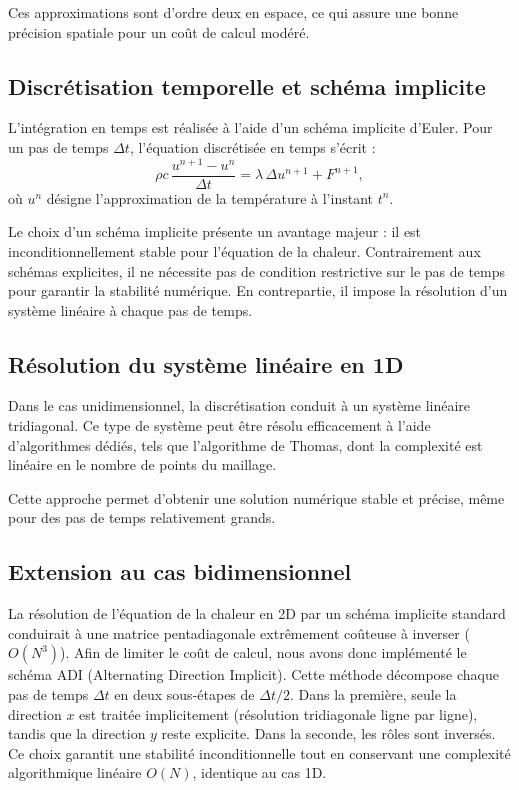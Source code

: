 \documentclass[a4paper,12pt]{article}
\begin{document}
Ces approximations sont d’ordre deux en espace, ce qui assure une bonne précision spatiale pour un coût de calcul modéré.

\subsection{Discrétisation temporelle et schéma implicite}

L’intégration en temps est réalisée à l’aide d’un schéma implicite d’Euler. Pour un pas de temps $\Delta t$, l’équation discrétisée en temps s’écrit :
\begin{equation}
\rho c \, \frac{u^{n+1} - u^n}{\Delta t}
= \lambda \, \Delta u^{n+1} + F^{n+1},
\end{equation}
où $u^n$ désigne l’approximation de la température à l’instant $t^n$.

Le choix d’un schéma implicite présente un avantage majeur : il est inconditionnellement stable pour l’équation de la chaleur. Contrairement aux schémas explicites, il ne nécessite pas de condition restrictive sur le pas de temps pour garantir la stabilité numérique. En contrepartie, il impose la résolution d’un système linéaire à chaque pas de temps.

\subsection{Résolution du système linéaire en 1D}

Dans le cas unidimensionnel, la discrétisation conduit à un système linéaire tridiagonal. Ce type de système peut être résolu efficacement à l’aide d’algorithmes dédiés, tels que l’algorithme de Thomas, dont la complexité est linéaire en le nombre de points du maillage.

Cette approche permet d’obtenir une solution numérique stable et précise, même pour des pas de temps relativement grands.

\subsection{Extension au cas bidimensionnel}

La résolution de l'équation de la chaleur en 2D par un schéma implicite standard conduirait à une matrice pentadiagonale extrêmement coûteuse à inverser ($O(N^3)$). Afin de limiter le coût de calcul, nous avons donc implémenté le schéma ADI (Alternating Direction Implicit).
Cette méthode décompose chaque pas de temps $\Delta t$ en deux sous-étapes de $\Delta t/2$. Dans la première, seule la direction $x$ est traitée implicitement (résolution tridiagonale ligne par ligne), tandis que la direction $y$ reste explicite. Dans la seconde, les rôles sont inversés. Ce choix garantit une stabilité inconditionnelle tout en conservant une complexité algorithmique linéaire $O(N)$, identique au cas 1D.
\end{document}
